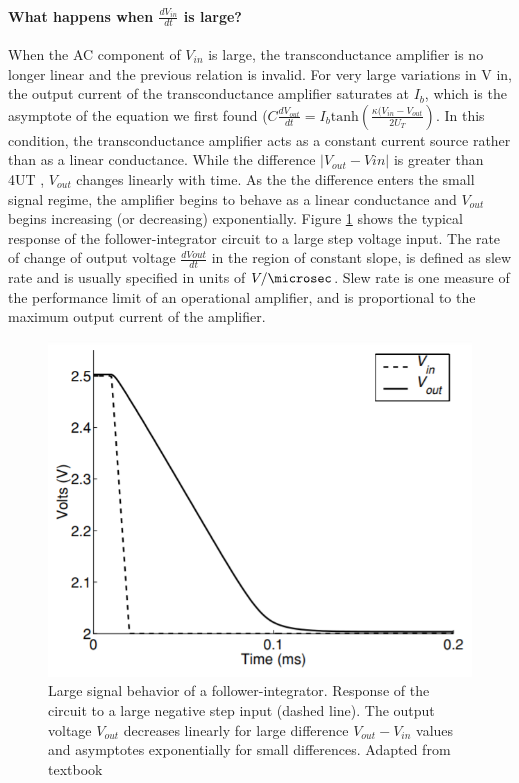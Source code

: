 \paragraph{What happens when $\frac{dV_{in}}{dt}$ is large?}
When the AC component of $V_{in}$ is large, the transconductance amplifier is no longer linear and the previous relation is invalid. For very large variations in V in, the output current of the transconductance amplifier saturates at $I_b$, which is the asymptote of the equation we first found ($C \frac{dV_{out}}{dt} = I_b \mathrm{tanh}(\frac{\kappa (V_{in} - V_{out}}{2 U_T})$.  In this condition, the transconductance amplifier
acts as a constant current source rather than as a linear conductance. While the difference $|V_{out} -   V{in}|$ is greater than 4UT , $V_{out}$ changes linearly with time. As the the difference enters the small signal regime, the amplifier begins to behave as a linear conductance and $V_{out}$ begins increasing (or decreasing) exponentially. 
Figure \ref{fig:Large_Signal_Follower_Integrator} shows the typical response of the follower-integrator circuit to
a large step voltage input. The rate of change of output voltage $\frac{dVout}{dt}$ in the region of constant slope, is defined as slew rate and is usually specified in units of $V / \microsec$. Slew rate is one measure of the performance limit of an operational amplifier, and is proportional to the maximum output current of the amplifier.


\begin{figure}[H]
    \centering
    \includegraphics[width=0.5\linewidth]{../../Figures/Large_Signal_Follower_Integrator.PNG}
    \caption{Large signal behavior of a follower-integrator. Response of the circuit to a large negative step input
(dashed line). The output voltage $V_{out}$ decreases linearly for large difference $V_{out} -  V_{in}$ values and asymptotes exponentially for small differences. Adapted from textbook}
    \label{fig:Large_Signal_Follower_Integrator}
\end{figure}

